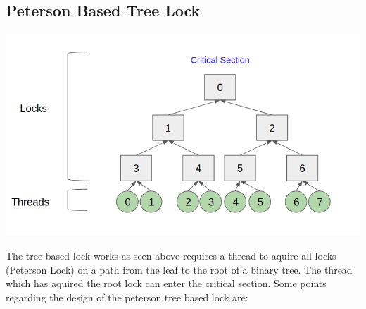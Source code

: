 \documentclass[a4paper,12pt]{report}
\begin{document}
\subsection{Peterson Based Tree Lock}
\begin{center}
\includegraphics[scale=0.4]{./a.png}
\end{center}
The tree based lock works as seen above requires a thread to aquire all locks (Peterson Lock) on a path from the leaf to the root of a binary tree. The thread which has aquired the root lock can enter the critical section.
Some points regarding the design of the peterson tree based lock are:
\end{document}
